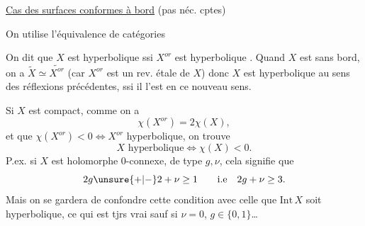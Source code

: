 \uline{Cas des surfaces conformes à bord} (pas néc. cptes)

On utilise l'équivalence de catégories

On dit que $X$ est hyperbolique ssi $X^{or}$ est hyperbolique . Quand $X$ est sans bord, on a $\widetilde X\simeq\widetilde{X^{or}}$ (car $X^{or}$ est un rev. étale de $X$) donc $X$ est hyperbolique au sens des réflexions précédentes, ssi il l'est en ce nouveau sens.

Si $X$ est compact,  comme on a
\[
\chi(X^{or})=2\chi(X),
\]
et que $\chi(X^{or})<0\Longleftrightarrow X^{or}$ hyperbolique, on trouve
\[
X\text{ hyperbolique}\Longleftrightarrow\chi(X)<0.
\]
P.ex. si $X$ est holomorphe 0-connexe, de type $g,\nu$, cela signifie que
\[
2g\unsure{+|-}2+\nu\geq1\qquad\text{i.e}\quad2g+\nu\geq3.
\]
Mais on se gardera de confondre cette condition avec celle que $\mathrm{Int}\,X$ soit hyperbolique, ce qui est tjrs vrai sauf si $\nu=0$, $g\in\{0,1\}$\ldots
